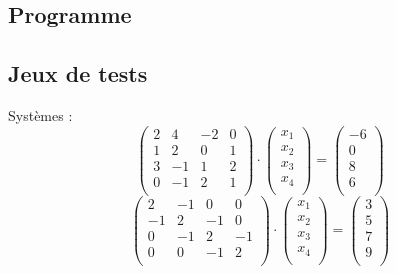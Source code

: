 \documentclass{report}
\begin{document}
      \subsection{Programme}
        
      \newpage
      \subsection{Jeux de tests}
        Systèmes :
        \begin{equation}
        \begin{pmatrix}
		  2 & 4 & -2 & 0 \\
		  1 & 2 & 0 & 1 \\
		  3 & -1 & 1 & 2 \\
		  0 & -1 & 2 & 1 \\
        \end{pmatrix}
        \cdot
        \begin{pmatrix}
          x_1 \\
          x_2 \\
          x_3 \\
          x_4 \\
        \end{pmatrix}
        =
        \begin{pmatrix}
          -6 \\
          0 \\
          8 \\
          6 \\
        \end{pmatrix}
        \end{equation}
        \begin{equation}
        \begin{pmatrix}
		  2 & -1 & 0 & 0 \\
		  -1 & 2 & -1 & 0 \\
		  0 & -1 & 2 & -1 \\
		  0 & 0 & -1 & 2 \\
        \end{pmatrix}
        \cdot
        \begin{pmatrix}
          x_1 \\
          x_2 \\
          x_3 \\
          x_4 \\
        \end{pmatrix}
        =
        \begin{pmatrix}
          3 \\
          5 \\
          7 \\
          9 \\
        \end{pmatrix}
        \end{equation}
\end{document}
